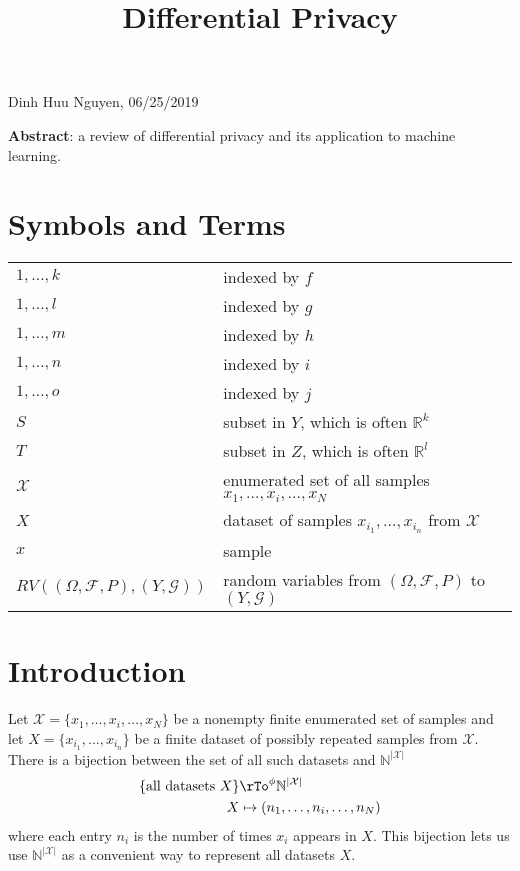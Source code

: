 \documentclass[12pt]{amsart}
\title{Differential Privacy}
\theoremstyle{definition}
\begin{document}
\maketitle

\begin{center} Dinh Huu Nguyen, 06/25/2019 \end{center}
\vspace{20pt}

\textbf{Abstract}: a review of differential privacy and its application to machine learning.
\vspace{20pt}

\tableofcontents

\section{Symbols and Terms}
 \begin{tabular}{l l}
$1, \dots , k$ & indexed by $f$ \\
$1, \dots , l$ & indexed by $g$ \\
$1, \dots , m$ & indexed by $h$ \\
$1, \dots , n$ & indexed by $i$ \\
$1, \dots , o$ & indexed by $j$ \\
$S$ & subset in $Y$, which is often $\mathbb{R}^k$ \\
$T$ & subset in $Z$, which is often $\mathbb{R}^l$ \\
$\mathcal{X}$ & enumerated set of all samples $x_1, \dots , x_i, \dots ,x_N$ \\
$X$ & dataset of samples $x_{i_1}, \dots , x_{i_n}$ from $\mathcal{X}$ \\
$x$ & sample \\
$RV((\Omega, \mathcal{F}, P), (Y, \mathcal{G}))$ & random variables from $(\Omega, \mathcal{F}, P)$ to $(Y, \mathcal{G})$ \\
\end{tabular}

\section{Introduction} Let $\mathcal{X} = \{x_1, \dots , x_i, \dots , x_N\}$ be a nonempty finite enumerated set of samples and let $X = \{x_{i_1}, \dots , x_{i_n}\}$ be a finite dataset of possibly repeated samples from $\mathcal{X}$. There is a bijection between the set of all such datasets and $\mathbb{N}^{|\mathcal{X}|}$
\begin{align*}
\{\text{all datasets } X\} & \rTo^{\phi} \mathbb{N}^{|\mathcal{X}|} \\
X & \mapsto (n_1, \dots , n_i, \dots , n_N)
\end{align*}
where each entry $n_i$ is the number of times $x_i$ appears in $X$. This bijection lets us use $\mathbb{N}^{|\mathcal{X}|}$ as a convenient way to represent all datasets $X$.
\end{document}
